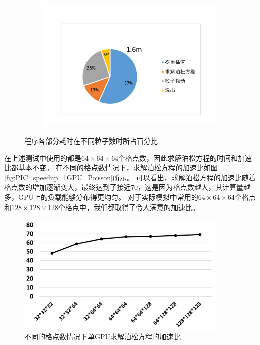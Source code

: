 \begin{figure}[!htb]
\begin{subfigure}[b]{0.75\textwidth}
        \includegraphics[width=\textwidth]{Img/PIC_speedup_1GPU_percentage3.pdf}
    \end{subfigure}
    \caption{程序各部分耗时在不同粒子数时所占百分比}\label{fig:PIC_speedup_1GPU_percentage}
\end{figure}

在上述测试中使用的都是$64 \times 64 \times 64$个格点数，因此求解泊松方程的时间和加速比都基本不变。
在不同的格点数情况下，求解泊松方程的加速比如图\eqref{fig:PIC_speedup_1GPU_Poisson}所示。
可以看出，求解泊松方程的加速比随着格点数的增加逐渐变大，最终达到了接近70，这是因为格点数越大，其计算量越多，GPU上的负载能够分布得更均匀。
对于实际模拟中常用的$64 \times 64 \times 64$个格点和$128 \times 128 \times 128$个格点中，我们都取得了令人满意的加速比。

\begin{figure}[!htb]
  \centering
  \includegraphics[width=0.9\textwidth]{Img/PIC_speedup_1GPU_Poisson.pdf}
  \caption{不同的格点数情况下单GPU求解泊松方程的加速比}
  \label{fig:PIC_speedup_1GPU_Poisson}
\end{figure}

